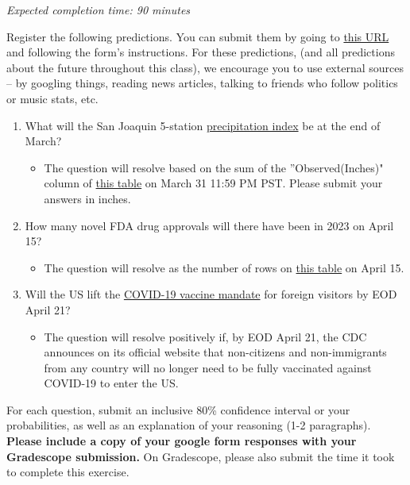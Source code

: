 \documentclass[11pt]{article}
\begin{document}
\emph{Expected completion time: 90 minutes}

Register the following predictions. You can submit them by going to \href{https://forms.gle/SWyxCaJK3ZxNcmgUA}{this URL} and following the form's instructions. For these predictions, (and all predictions about the future throughout this class), we encourage you to use external sources -- by googling things, reading news articles, talking to friends who follow politics or music stats, etc.

\begin{enumerate}
    \item What will the San Joaquin 5-station \href{https://cdec.water.ca.gov/reportapp/javareports?name=PLOT_FSI.pdf}{precipitation index} be at the end of March?
    \begin{itemize}
		\item The question will resolve based on the sum of the ''Observed(Inches)" column of  \href{https://cdec.water.ca.gov/reportapp/javareports?name=TAB_FSI.pdf}{this table} on March 31 11:59 PM PST. Please submit your answers in inches.
	\end{itemize}
	\item How many novel FDA drug approvals will there have been in 2023 on April 15? 
	\begin{itemize}
		\item The question will resolve as the number of rows on \href{https://www.fda.gov/drugs/new-drugs-fda-cders-new-molecular-entities-and-new-therapeutic-biological-products/novel-drug-approvals-2023}{this table} on April 15.
	\end{itemize}
	\item Will the US lift the \href{https://www.cdc.gov/coronavirus/2019-ncov/travelers/proof-of-vaccination.html}{COVID-19 vaccine mandate} for foreign visitors by EOD April 21?
    \begin{itemize}
		\item The question will resolve positively if, by EOD April 21, the CDC announces on its official website that non-citizens and non-immigrants from any country will no longer need to be fully vaccinated against COVID-19 to enter the US.
	\end{itemize}
\end{enumerate}

For each question, submit an inclusive 80\% confidence interval or your probabilities, as well as an explanation of your reasoning (1-2 paragraphs). \textbf{Please include a copy of your google form responses with your Gradescope submission.} On Gradescope, please also submit the time it took to complete this exercise.
\end{document}
